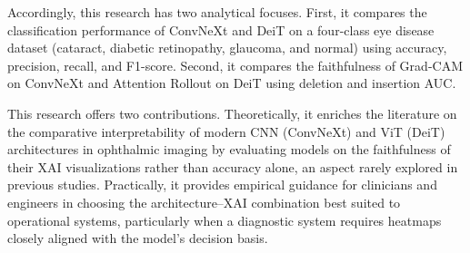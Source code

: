 Accordingly, this research has two analytical focuses. First, it compares the classification performance of ConvNeXt and DeiT on a four-class eye disease dataset (cataract, diabetic retinopathy, glaucoma, and normal) using accuracy, precision, recall, and F1-score. Second, it compares the faithfulness of Grad-CAM on ConvNeXt and Attention Rollout on DeiT using deletion and insertion AUC.

This research offers two contributions. Theoretically, it enriches the literature on the comparative interpretability of modern CNN (ConvNeXt) and ViT (DeiT) architectures in ophthalmic imaging by evaluating models on the faithfulness of their XAI visualizations rather than accuracy alone, an aspect rarely explored in previous studies. Practically, it provides empirical guidance for clinicians and engineers in choosing the architecture--XAI combination best suited to operational systems, particularly when a diagnostic system requires heatmaps closely aligned with the model's decision basis.

